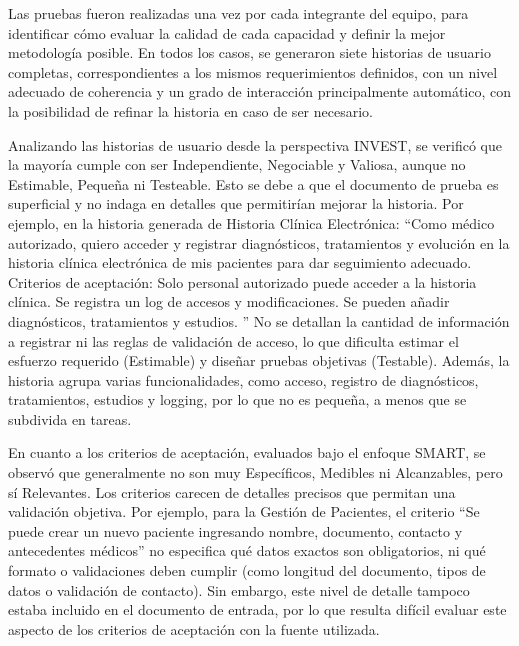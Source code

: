 Las pruebas fueron realizadas una vez por cada integrante del equipo, para identificar cómo evaluar la calidad de cada capacidad y definir la mejor metodología posible. En todos los casos, se generaron siete historias de usuario completas, correspondientes a los mismos requerimientos definidos, con un nivel adecuado de coherencia y un grado de interacción principalmente automático, con la posibilidad de refinar la historia en caso de ser necesario.

Analizando las historias de usuario desde la perspectiva INVEST, se verificó que la mayoría cumple con ser Independiente, Negociable y Valiosa, aunque no Estimable, Pequeña ni Testeable. Esto se debe a que el documento de prueba es superficial y no indaga en detalles que permitirían mejorar la historia. Por ejemplo, en la historia generada de Historia Clínica Electrónica: ``Como médico autorizado, quiero acceder y registrar diagnósticos, tratamientos y evolución en la historia clínica electrónica de mis pacientes para dar seguimiento adecuado. Criterios de aceptación:
Solo personal autorizado puede acceder a la historia clínica.
Se registra un log de accesos y modificaciones.
Se pueden añadir diagnósticos, tratamientos y estudios.
'' No se detallan la cantidad de información a registrar ni las reglas de validación de acceso, lo que dificulta estimar el esfuerzo requerido (Estimable) y diseñar pruebas objetivas (Testable). Además, la historia agrupa varias funcionalidades, como acceso, registro de diagnósticos, tratamientos, estudios y logging, por lo que no es pequeña, a menos que se subdivida en tareas. %

En cuanto a los criterios de aceptación, evaluados bajo el enfoque SMART, se observó que generalmente no son muy Específicos, Medibles ni Alcanzables, pero sí Relevantes. Los criterios carecen de detalles precisos que permitan una validación objetiva. Por ejemplo, para la Gestión de Pacientes, el criterio ``Se puede crear un nuevo paciente ingresando nombre, documento, contacto y antecedentes médicos'' no especifica qué datos exactos son obligatorios, ni qué formato o validaciones deben cumplir (como longitud del documento, tipos de datos o validación de contacto). Sin embargo, este nivel de detalle tampoco estaba incluido en el documento de entrada, por lo que resulta difícil evaluar este aspecto de los criterios de aceptación con la fuente utilizada. %

